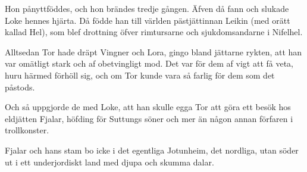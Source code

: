 Hon pånyttföddes, och hon brändes tredje gången. Äfven då fann och
slukade Loke hennes hjärta. Då födde han till världen pästjättinnan
Leikin (med orätt kallad Hel), som blef drottning öfver rimtursarne och
sjukdomsandarne i Nifelhel.



Alltsedan Tor hade dräpt Vingner och Lora, gingo bland jättarne rykten,
att han var omätligt stark och af obetvingligt mod. Det var för dem af
vigt att få veta, huru härmed förhöll sig, och om Tor kunde vara så
farlig för dem som det påstods.

Och så uppgjorde de med Loke, att han skulle egga Tor att göra ett besök
hos eldjätten Fjalar, höfding för Suttungs söner och mer än någon annan
förfaren i trollkonster.

Fjalar och hans stam bo icke i det egentliga Jotunheim, det nordliga,
utan söder ut i ett underjordiskt land med djupa och skumma dalar.

